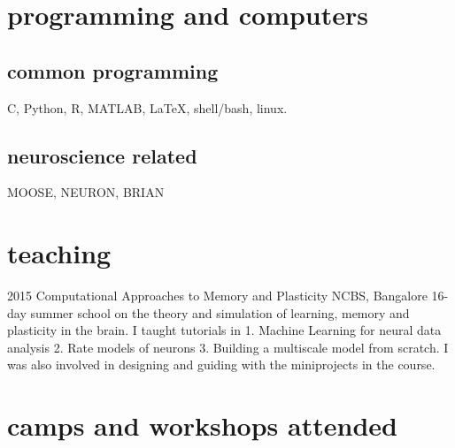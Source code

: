 \documentclass[11pt,print]{friggeri-cv}%
\begin{document}
\section{programming and computers}


\begin{multicols}{2}[]

\begin{minipage}{1.1\columnwidth}

\subsection{common programming}
C,
 Python,
  R, 
    MATLAB,
{    \lotsoftextfont \LaTeX},
    shell/bash,
    linux.

\end{minipage}

\hspace{-1em}
\begin{minipage}{1.05\columnwidth}
    

\subsection{neuroscience related}
MOOSE, NEURON, BRIAN 

\end{minipage}

\end{multicols}


\section{teaching}

\begin{entrylist}
  \entry
    {2015}
    {Computational Approaches to Memory and Plasticity }
    {NCBS, Bangalore}
    {16-day summer school on the theory and simulation of learning, memory and plasticity in the brain.}
    {I taught tutorials in 1. Machine Learning for neural data analysis 2. Rate models of neurons 3. Building a multiscale model from scratch. I was also involved in designing and guiding with the miniprojects in the course.  }
\end{entrylist}



\pagebreak

\section{camps and workshops attended}
\end{document}
